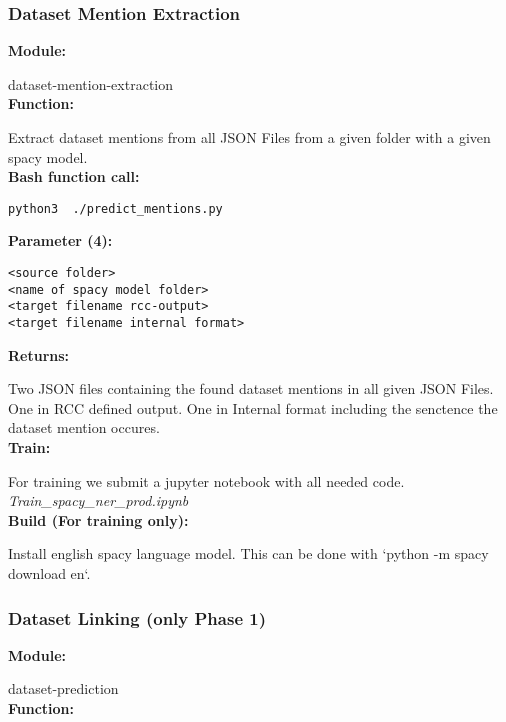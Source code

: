 \subsubsection{Dataset Mention Extraction}
\textbf{Module: }

dataset-mention-extraction\\
\textbf{Function:}

Extract dataset mentions from all JSON Files from a given folder with a given spacy model.\\
\textbf{Bash function call: }
\begin{lstlisting}
python3  ./predict_mentions.py
\end{lstlisting}
\textbf{Parameter (4): }
\begin{lstlisting}
<source folder>
<name of spacy model folder>
<target filename rcc-output>
<target filename internal format>
\end{lstlisting}
\textbf{Returns: }

Two JSON files containing the found dataset mentions in all given JSON Files.
One in RCC defined output.
One in Internal format including the senctence the dataset mention occures.\\
\textbf{Train: }

For training we submit a jupyter notebook with all needed code.
\emph{Train_spacy_ner_prod.ipynb}\\
\textbf{Build (For training only): }

Install english spacy language model.
This can be done with `python -m spacy download en`.

\begin{comment}
\textfg{}
For evaluation we first predict with the predictor which is used in production `predict_mentions.py`. We run this script on the test data and the result is a new field in paragraph data called `predicted_standoff`.
During evaluation with `evaluate.py` this filed is compared to the `standoff` field. The only parameter `evaluate.py` needs is the filename of the test data and the filename where the results should be saved in json format.
\end{comment}


\subsubsection{Dataset Linking (only Phase 1)}
\textbf{Module: }

dataset-prediction\\
\textbf{Function: }

